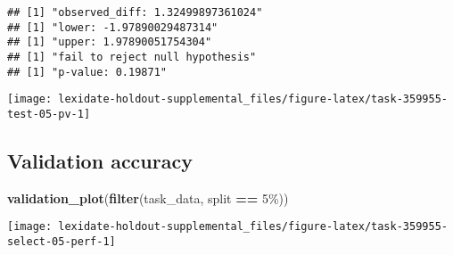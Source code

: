 \documentclass[
]{book}
\newenvironment{Shaded}{\begin{snugshade}}{\end{snugshade}}
\newcommand{\AttributeTok}[1]{\textcolor[rgb]{0.13,0.29,0.53}{#1}}
\newcommand{\DecValTok}[1]{\textcolor[rgb]{0.00,0.00,0.81}{#1}}
\newcommand{\FunctionTok}[1]{\textcolor[rgb]{0.13,0.29,0.53}{\textbf{#1}}}
\newcommand{\NormalTok}[1]{#1}
\newcommand{\OtherTok}[1]{\textcolor[rgb]{0.56,0.35,0.01}{#1}}
\newcommand{\SpecialCharTok}[1]{\textcolor[rgb]{0.81,0.36,0.00}{\textbf{#1}}}
\newcommand{\StringTok}[1]{\textcolor[rgb]{0.31,0.60,0.02}{#1}}
\begin{document}
\begin{Shaded}
\end{Shaded}

\begin{verbatim}
## [1] "observed_diff: 1.32499897361024"
## [1] "lower: -1.97890029487314"
## [1] "upper: 1.97890051754304"
## [1] "fail to reject null hypothesis"
## [1] "p-value: 0.19871"
\end{verbatim}

\texttt{[image: lexidate-holdout-supplemental\_files/figure-latex/task-359955-test-05-pv-1]}

\hypertarget{validation-accuracy-10}{%
\subsection{Validation accuracy}\label{validation-accuracy-10}}

\begin{Shaded}
\begin{Highlighting}[]
\FunctionTok{validation\_plot}\NormalTok{(}\FunctionTok{filter}\NormalTok{(task\_data, split }\SpecialCharTok{==} \StringTok{\textquotesingle{}5\%\textquotesingle{}}\NormalTok{))}
\end{Highlighting}
\end{Shaded}

\texttt{[image: lexidate-holdout-supplemental\_files/figure-latex/task-359955-select-05-perf-1]}
\end{document}
